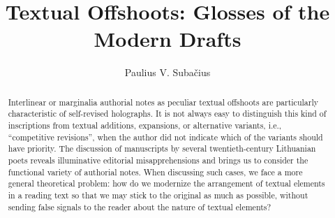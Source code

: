 \documentclass{article}
\author{Paulius V. Subačius}
\title{Textual Offshoots: Glosses of the Modern Drafts}
\begin{document}
\maketitle
\renewcommand*{\pagemark}{}

\begin{abstract}
Interlinear or marginalia authorial notes as peculiar textual offshoots
are particularly characteristic of self-revised holographs. It is not
always easy to distinguish this kind of inscriptions from textual
additions, expansions, or alternative variants, i.e., ``competitive
revisions'', when the author did not indicate which of the variants should have priority. The discussion of manuscripts by several
twentieth-century Lithuanian poets reveals illuminative editorial
misapprehensions and brings us to consider the functional variety of
authorial notes. When discussing such cases, we face a more general
theoretical problem: how do we modernize the arrangement of textual
elements in a reading text so that we may stick to the original as much as possible, without sending false signals to the reader about the nature of textual elements?
\end{abstract}


\end{document}
